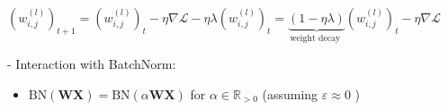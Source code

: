 
$
\left(w_{i, j}^{(l)}\right)_{t+1}=\left(w_{i, j}^{(l)}\right)_{t}-\eta \nabla \mathscr{L}-\eta \lambda\left(w_{i, j}^{(l)}\right)_{t}=\underbrace{(1-\eta \lambda)}_{\text {weight decay }}\left(w_{i, j}^{(l)}\right)_{t}-\eta \nabla \mathscr{L}
$

- Interaction with BatchNorm:

\begin{itemize}
  \item $\mathrm{BN}(\mathbf{W X})=\mathrm{BN}(\alpha \mathbf{W X})$ for $\alpha \in \mathbb{R}_{>0}$ (assuming $\varepsilon \approx 0$ )
\end{itemize}










